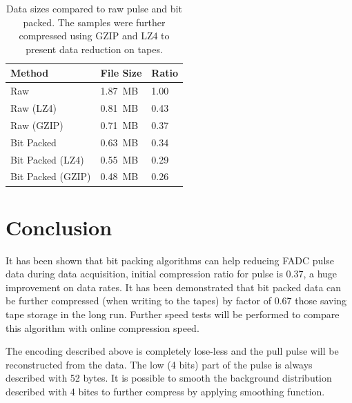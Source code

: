 \documentclass[12pt]{article}
\begin{document}
\begin{table}[!h]
\begin{center}
\begin{tabular}{  p{8cm} | p{2cm} | p{1.5cm} }
\hline 
Method & File Size & Ratio \\
\hline 
\hline 
Raw & 1.87~MB & 1.00 \\
Raw (LZ4) & 0.81~MB & 0.43 \\
Raw (GZIP) & 0.71~MB & 0.37 \\
\rowcolor{LightCyan}
Bit Packed &  0.63~MB & 0.34 \\
Bit Packed (LZ4) & 0.55~MB & 0.29 \\
\rowcolor{LightRose}
Bit Packed (GZIP) & 0.48~MB & 0.26 \\
\hline
\end{tabular}
\caption{Data sizes compared to raw pulse and bit packed. The samples were further
compressed using GZIP and LZ4 to present data reduction on tapes.}
\end{center}
\end{table}

\section{Conclusion}

It has been shown that bit packing algorithms can help reducing FADC pulse data during data
acquisition, initial compression ratio for pulse is 0.37, a huge improvement on data rates. It has
been demonstrated that bit packed data can be further compressed (when writing to the tapes)
by factor of 0.67 those saving tape storage in the long run. Further speed tests will be performed 
to compare this algorithm with online compression speed.

The encoding described above is completely lose-less and the pull pulse will be reconstructed 
from the data. The low (4 bits) part of the pulse is always described with 52 bytes. It is possible
to smooth the background distribution described with 4 bites to further compress by applying 
smoothing function. 
\end{document}
